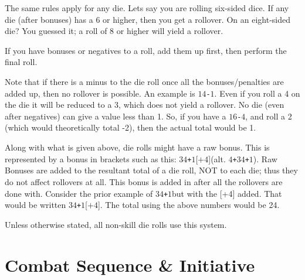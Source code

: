\documentclass[twoside]{book}
\begin{document}
    {  
     The same rules apply for any die. Lets say you are
               rolling six-sided dice. If any die (after bonuses) has a 6
               or higher, then you get a rollover. On an eight-sided die?
               You guessed it; a roll of 8 or higher will yield a
               rollover. 
    }
  
    {  
     If you have bonuses or negatives to a roll, add them
               up first, then perform the final roll. 
    }
  
    {  
     Note that if there is a minus to the die roll once
               all the bonuses/penalties are added up, then no rollover
               is possible. An example is \ensuremath{1}\ensuremath{4}\texttt{-}\ensuremath{1}. Even if you roll a 4 on
               the die it will be reduced to a 3, which does not yield a
               rollover. No die (even after negatives) can give a value
               less than 1. So, if you have a \ensuremath{1}\ensuremath{6}\texttt{-}\ensuremath{4}, and roll a 2 (which
               would theoretically total -2), then the actual total would
               be 1. 
    }
  
    {  
     Along with what is given above, die rolls might have
               a raw bonus. This is represented by a bonus in brackets
               such as this: \ensuremath{3}\ensuremath{4}\texttt{+}\ensuremath{1}\textscbf{}[\ensuremath{\texttt{+}\ensuremath{4}}](alt. \ensuremath{4}\texttt{+}\ensuremath{3}\ensuremath{4}\texttt{+}\ensuremath{1}). Raw Bonuses are
               added to the resultant total of a die roll, NOT to each
               die; thus they do not affect rollovers at all. This bonus
               is added in after all the rollovers are done with.
               Consider the prior example of \ensuremath{3}\ensuremath{4}\texttt{+}\ensuremath{1}but with the [+4]
               added. That would be written \ensuremath{3}\ensuremath{4}\texttt{+}\ensuremath{1}\textscbf{}[\ensuremath{\texttt{+}\ensuremath{4}}]. The total using
               the above numbers would be 24. 
    }
  
    {  
     Unless otherwise stated, all non-skill die rolls use
               this system. 
    }
  
    

\section{Combat Sequence \& Initiative}
    
\end{document}
